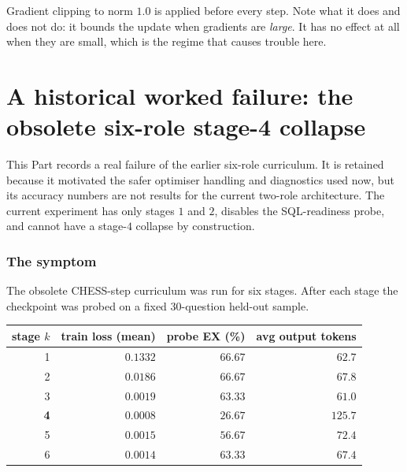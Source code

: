 \documentclass[11pt]{article}
\theoremstyle{definition}
\begin{document}
\begin{center}
\end{center}

Gradient clipping to norm $1.0$ is applied before every step. Note what it does and does not do: it bounds the update when gradients are \emph{large}. It has no effect at all when they are small, which is the regime that causes trouble here.

\newpage
\part{A historical worked failure: the obsolete six-role stage-4 collapse}
\label{part:collapse}

This Part records a real failure of the earlier six-role curriculum. It is retained because it motivated the safer optimiser handling and diagnostics used now, but its accuracy numbers are not results for the current two-role architecture. The current experiment has only stages $1$ and $2$, disables the SQL-readiness probe, and cannot have a stage-$4$ collapse by construction.

\section{The symptom}

The obsolete CHESS-step curriculum was run for six stages. After each stage the checkpoint was probed on a fixed $30$-question held-out sample.

\begin{center}
\begin{tabular}{rrrr}
\toprule
stage $k$ & train loss (mean) & probe EX (\%) & avg output tokens \\
\midrule
1 & $0.1332$ & $66.67$ & $62.7$ \\
2 & $0.0186$ & $66.67$ & $67.8$ \\
3 & $0.0019$ & $63.33$ & $61.0$ \\
\textbf{4} & $\mathbf{0.0008}$ & $\mathbf{26.67}$ & $\mathbf{125.7}$ \\
5 & $0.0015$ & $56.67$ & $72.4$ \\
6 & $0.0014$ & $63.33$ & $67.4$ \\
\bottomrule
\end{tabular}
\end{center}
\end{document}
